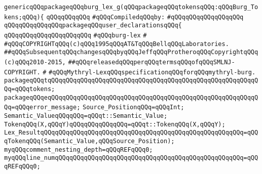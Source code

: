 \label{src/app/burg/burg.lex.pkg}
\verb|genericqQQqpackageqQQqburg_lex_g(qQQqpackageqQQqtokensqQQq:qQQqBurg_Tokens;qQQq){|\newline
\verb|qQQqqQQqqQQq|\newline
\verb|#qQQqCompiledqQQqby:|\newline
\verb|#qQQqqQQqqQQqqQQqqQQq|\newline
\newline
\verb|qQQqqQQqqQQqqQQqpackageqQQquser_declarationsqQQq{|\newline
\verb|qQQqqQQqqQQqqQQqqQQqqQQq|\newline
\verb|#qQQqburg-lex|\newline
\verb|#|\newline
\verb|#qQQqCOPYRIGHTqQQq(c)qQQq1995qQQqAT&TqQQqBellqQQqLaboratories.|\newline
\verb|##qQQqSubsequentqQQqchangesqQQqbyqQQqJeffqQQqProtheroqQQqCopyrightqQQq(c)qQQq2010-2015,|\newline
\verb|##qQQqreleasedqQQqperqQQqtermsqQQqofqQQqSMLNJ-COPYRIGHT.|\newline
\verb|#|\newline
\verb|#qQQqMythryl-LexqQQqspecificationqQQqforqQQqmythryl-burg.|\newline
\newline
\newline
\newline
\verb|packageqQQqtqQQqqQQqqQQqqQQqqQQqqQQqqQQqqQQqqQQqqQQqqQQqqQQqqQQqqQQqqQQq=qQQqtokens;|\newline
\verb|packageqQQqeqQQqqQQqqQQqqQQqqQQqqQQqqQQqqQQqqQQqqQQqqQQqqQQqqQQqqQQqqQQq=qQQqerror_message;|\newline
\newline
\verb|Source_PositionqQQq=qQQqInt;|\newline
\verb|Semantic_ValueqQQqqQQq=qQQqt::Semantic_Value;|\newline
\verb|TokenqQQq(X,qQQqY)qQQqqQQqqQQqqQQq=qQQqt::TokenqQQq(X,qQQqY);|\newline
\verb|Lex_ResultqQQqqQQqqQQqqQQqqQQqqQQqqQQqqQQqqQQqqQQqqQQqqQQqqQQqqQQq=qQQqTokenqQQq(Semantic_Value,qQQqSource_Position);|\newline
\newline
\verb|myqQQqcomment_nesting_depth=qQQqREFqQQq0;|\newline
\verb|myqQQqline_numqQQqqQQqqQQqqQQqqQQqqQQqqQQqqQQqqQQqqQQqqQQqqQQqqQQq=qQQqREFqQQq0;|\newline
